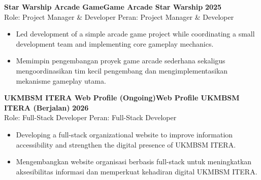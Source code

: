 \textbf{\ifenglish Star Warship Arcade Game\else Game Arcade Star Warship\fi} \hfill \textbf{2025} \\
\ifenglish Role: Project Manager \& Developer
\else Peran: Project Manager \& Developer
\fi
\begin{itemize}[leftmargin=*, itemsep=1pt, topsep=1pt]
\ifenglish
\item Led development of a simple arcade game project while coordinating a small development team and implementing core gameplay mechanics.
\else
\item Memimpin pengembangan proyek game arcade sederhana sekaligus mengoordinasikan tim kecil pengembang dan mengimplementasikan mekanisme gameplay utama.
\fi
\end{itemize}

\textbf{\ifenglish UKMBSM ITERA Web Profile (Ongoing)\else Web Profile UKMBSM ITERA (Berjalan)\fi} \hfill \textbf{2026} \\
\ifenglish Role: Full-Stack Developer
\else Peran: Full-Stack Developer
\fi
\begin{itemize}[leftmargin=*, itemsep=1pt, topsep=1pt]
\ifenglish
\item Developing a full-stack organizational website to improve information accessibility and strengthen the digital presence of UKMBSM ITERA.
\else
\item Mengembangkan website organisasi berbasis full-stack untuk meningkatkan aksesibilitas informasi dan memperkuat kehadiran digital UKMBSM ITERA.
\fi
\end{itemize}